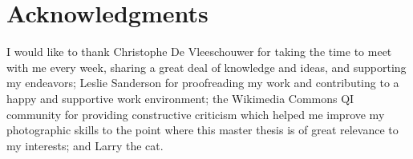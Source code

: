 



\bigskip

\begingroup
\let\clearpage\relax
\let\cleardoublepage\relax
\let\cleardoublepage\relax
\chapter*{Acknowledgments}
I would like to thank Christophe De Vleeschouwer for taking the time to meet with me every week, sharing a great deal of knowledge and ideas, and supporting my endeavors; Leslie Sanderson for proofreading my work and contributing to a happy and supportive work environment; the Wikimedia Commons QI community for providing constructive criticism which helped me improve my photographic skills to the point where this master thesis is of great relevance to my interests; and Larry the cat.
%
%
%
%


\endgroup
